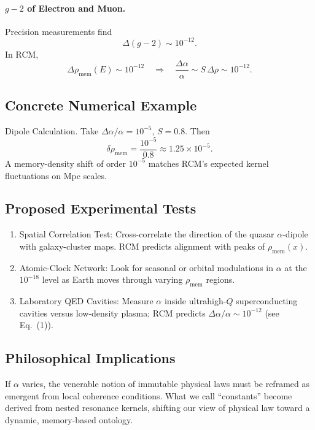 \paragraph{\(g-2\) of Electron and Muon.}  
Precision measurements find
\[
\Delta(g-2)\sim10^{-12}.
\]
In RCM,
\[
\Delta\rho_{\mathrm{mem}}(E)\sim10^{-12}
\quad\Longrightarrow\quad
\frac{\Delta\alpha}{\alpha}\sim S\,\Delta\rho\sim10^{-12}.
\]

\bigskip

\subsection{Concrete Numerical Example}

Dipole Calculation.  
Take \(\Delta\alpha/\alpha=10^{-5}\), \(S=0.8\). Then
\[
\delta\rho_{\mathrm{mem}}
= \frac{10^{-5}}{0.8}
\approx1.25\times10^{-5}.
\]
A memory-density shift of order \(10^{-5}\) matches RCM’s expected kernel fluctuations on Mpc scales.

\bigskip

\subsection*{Proposed Experimental Tests}

\begin{enumerate}
  \item Spatial Correlation Test:  
    Cross-correlate the direction of the quasar \(\alpha\)-dipole with galaxy-cluster maps. RCM predicts alignment with peaks of \(\rho_{\mathrm{mem}}(x)\).
  \item Atomic-Clock Network:  
    Look for seasonal or orbital modulations in \(\alpha\) at the \(10^{-18}\) level as Earth moves through varying \(\rho_{\mathrm{mem}}\) regions.
  \item Laboratory QED Cavities:  
    Measure \(\alpha\) inside ultrahigh-\(Q\) superconducting cavities versus low-density plasma; RCM predicts \(\Delta\alpha/\alpha\sim10^{-12}\) (see Eq.~(1)).
\end{enumerate}

\bigskip

\subsection{Philosophical Implications}

If \(\alpha\) varies, the venerable notion of immutable physical laws must be reframed as emergent from local coherence conditions. What we call “constants” become derived from nested resonance kernels, shifting our view of physical law toward a dynamic, memory-based ontology.


